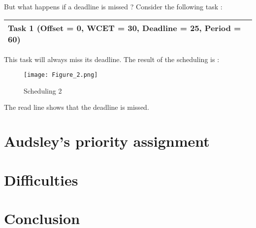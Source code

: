 \documentclass[a4paper,12pt]{article}
\begin{document}
\newpage 
\noindent
But what happens if a deadline is missed ? Consider the following task : \\
\begin{center}
\begin{tabular}{| l |}
\hline
Task 1 (Offset = 0, WCET = 30, Deadline = 25, Period = 60)\\
\hline
\end{tabular}
\end{center}
This task will always miss its deadline. The result of the scheduling is :\\

\begin{figure}[h!]
  \centering
  \texttt{[image: Figure\_2.png]}
  \caption{Scheduling 2}
  \label{fig: Scheduling 2}
\end{figure}
\noindent
 The read line shows that the deadline is missed. 
 
\newpage
\section{Audsley’s priority assignment}

\newpage

\section{Difficulties}

\newpage

\section{Conclusion}
\end{document}
